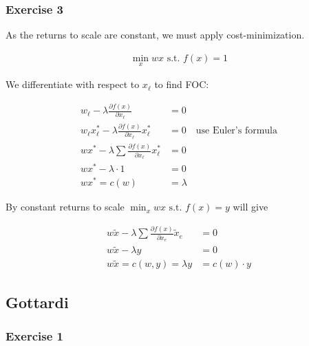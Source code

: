 \subsubsection*{Exercise 3}

As the returns to scale are constant, we must apply cost-minimization.

\begin{align*}
    \min_x wx \text { s.t. } f(x)=1
\end{align*}

We differentiate with respect to $x_\ell$ to find FOC:

\begin{align*}
    w_\ell-\lambda \frac{\partial f(x)}{\partial x_\ell} &= 0 \\
    w_\ell x_\ell^*-\lambda \frac{\partial f(x)}{\partial x_\ell} x_\ell^* &= 0 \quad \text{use Euler's formula} \\
    w x^*-\lambda \sum \frac{\partial f(x)}{\partial x_\ell} x_\ell^* &= 0 \\
    w x^*-\lambda \cdot 1 &= 0 \\
    w x^*=c(w) &= \lambda
\end{align*}

By constant returns to scale $\min _x wx \text { s.t. } f(x)=y$ will give

\begin{align*}
    w \tilde{x}-\lambda \sum \frac{\partial f(x)}{\partial x_e} \tilde{x}_e &= 0 \\
    w \tilde{x}-\lambda y &= 0 \\
    w \tilde{x}=c(w, y)=\lambda y &= c(w) \cdot y
\end{align*}

\newpage
{
\subsection*{Gottardi}

\subsubsection*{Exercise 1}
}
